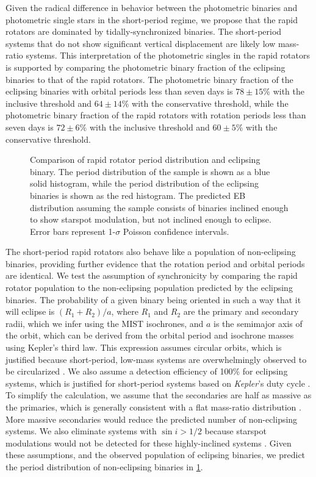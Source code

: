 \documentclass[manuscript]{aastex6}
\newcommand{\Kepler}{\mbox{\textit{Kepler}}}
\begin{document}
Given the radical difference in behavior between the photometric binaries and
photometric single stars in the short-period regime, we propose that the 
rapid rotators are dominated by tidally-synchronized binaries. The 
short-period systems that do not show significant vertical displacement are 
likely low mass-ratio systems. This interpretation of the photometric singles 
in the rapid rotators is supported by comparing the photometric binary 
fraction of the eclipsing binaries to that of the rapid rotators. The 
photometric binary fraction of the eclipsing binaries with orbital periods 
less than seven days is \(78 \pm 15\%\) with the inclusive threshold and 
\(64 \pm 14\%\) with the conservative threshold, while the photometric 
binary fraction of the rapid rotators with rotation periods less than seven 
days is \(72 \pm 6\%\) with the inclusive threshold and \(60 \pm 5\%\) with 
the conservative threshold.  

\begin{figure}[htb]
    \centering
    \caption{Comparison of rapid rotator period distribution and eclipsing
    binary. The period distribution of the \citep{McQuillan14} sample is shown
as a blue solid histogram, while the period distribution of the eclipsing binaries
is shown as the red histogram. The predicted EB distribution assuming the
\citep{McQuillan14} sample consists of binaries inclined enough to show
starspot modulation, but not inclined enough to eclipse. Error bars represent
1-\(\sigma\) Poisson confidence intervals.}\label{fig:eclipseprob}
\end{figure}

The short-period rapid rotators also behave like a population of non-eclipsing
binaries, providing further evidence that the rotation period and orbital
periods are identical. We test the assumption of synchronicity by comparing the
rapid rotator population to the non-eclipsing population predicted by the
eclipsing binaries. The probability of a given binary being oriented in such a
way that it will eclipse is \((R_1 + R_2)/a\), where \(R_1\) and \(R_2\) are
the primary and secondary radii, which we infer using the MIST isochrones, 
and \(a\) is the semimajor axis of the orbit, which can be derived from the
orbital period and isochrone masses using Kepler's third law.
This expression assumes circular orbits, which is justified because
short-period, low-mass systems are overwhelmingly observed to be circularized
\citep{Raghavan10,VanEylen16}. We also assume a detection efficiency of 100\%
for eclipsing systems, which is justified for short-period systems based on 
\Kepler{}'s duty cycle \citep{Kirk16}. To simplify the calculation, we
assume that the secondaries are half as massive as the primaries, which is
generally consistent with a flat mass-ratio distribution \citep{Raghavan10}. 
More massive secondaries would reduce the predicted number of non-eclipsing 
systems. We also eliminate systems with \(\sin i > 1/2\) because starspot
modulations would not be detected for these highly-inclined systems 
\citep{Jackson10,Rebull17}. Given these assumptions, and the observed 
population of eclipsing binaries, we predict the period distribution of 
non-eclipsing binaries in \cref{fig:eclipseprob}. 
\end{document}
